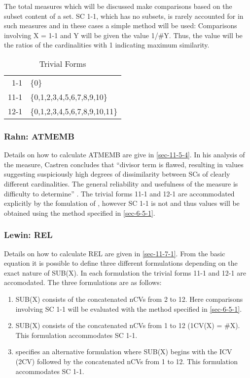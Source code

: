 \documentclass{article}
\begin{document}
The total measures which will be discussed make comparisons based on
the subset content of a set. SC 1-1, which has no subsets, is rarely
accounted for in such measures and in these cases a simple method will
be used: Comparisons involving X = 1-1 and Y will be given the value
1/\#Y. Thus, the value will be the ratios of the cardinalities with 1
indicating maximum similarity.
\begin{table}[htb]
\caption{Trivial Forms} 
\begin{center}
\begin{tabular}{rl}
  1-1  &  \{0\}                          \\
 11-1  &  \{0,1,2,3,4,5,6,7,8,9,10\}     \\
 12-1  &  \{0,1,2,3,4,5,6,7,8,9,10,11\}  \\
\end{tabular}
\end{center}
\end{table}
\subsubsection{Rahn: ATMEMB}
\label{sec-6-5-2}

Details on how to calculate ATMEMB are give in \ref{sec-11-5-4}. In his analysis
of the measure, Castren concludes that ``divisor term is flawed,
resulting in values suggesting suspiciously high degrees of
dissimilarity between SCs of clearly different cardinalities. The
general reliability and usefulness of the measure is difficulty to
determine'' \citep[pp. 89]{Castren1994}. The trivial forms 11-1 and
12-1 are accommodated explicitly by the fomulation of
\citet{Rahn1979}, however SC 1-1 is not and thus values will be
obtained using the method specified in \ref{sec-6-5-1}.
\subsubsection{Lewin: REL}
\label{sec-6-5-3}

Details on how to calculate REL are given in \ref{sec-11-7-1}. From the basic
equation it is possible to define three different formulations
depending on the exact nature of SUB(X). In each formulation the
trivial forms 11-1 and 12-1 are accomodated. The three formulations
are as follows:
\begin{enumerate}
\item SUB(X) consists of the concatenated nCVs from 2 to 12. Here
   comparisons involving SC 1-1 will be evaluated with the method
   specified in \ref{sec-6-5-1}.
\item SUB(X) consists of the concatenated nCVs from 1 to 12 (1CV(X)
   = \#X). This formulation accommodates SC 1-1.
\item \citet{Martorell2013} specifies an alternative formulation where
   SUB(X) begins with the ICV (2CV) followed by the concatenated nCVs
   from 1 to 12. This formulation accommodates SC 1-1.
\end{enumerate}
\end{document}
